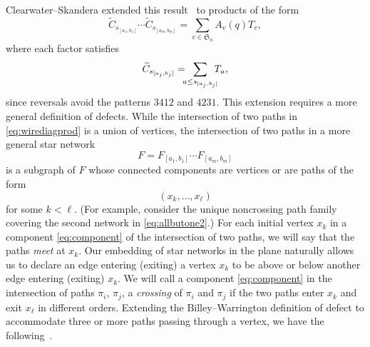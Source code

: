 \documentclass[12pt]{amsart}
\theoremstyle{definition}
\numberwithin{equation}{section}
\newcommand{\sn}{\mathfrak{S}_n}
\newcommand{\hnq}{H_n(q)}
\newcommand{\hanq}{H_n^{\msfA}(q)}
\newcommand{\wtc}[2]{\widetilde{C}_{#1}}
\newcommand{\avoidp}{avoid the patterns $3412$ and $4231${}}
\newcommand{\nTksp}{\negthickspace\negthickspace}
\newcommand{\msfA}{\mathsf{A}}
\newcommand{\msfBC}{\mathsf{BC}}
\begin{document}
Clearwater--Skandera 
extended this 
result~\cite[Cor.\,5.3]{CSkanTNNChar} to products of the form
\begin{equation}\label{eq:CSprod}
\wtc{s_{[a_1,b_1]}}q \cdots \wtc{s_{[a_m,b_m]}}q
= \sum_{v \in \sn} A_v(q) T_v,
\end{equation}
where 
each factor satisfies
\begin{equation*}
    \wtc{s_{[a_j,b_j]}}q = \nTksp \sum_{u \leq s_{[a_j,b_j]}} \nTksp T_u,
\end{equation*}
since reversals \avoidp.
This extension requires a more general definition of defects.
While the intersection of two paths in 
\eqref{eq:wirediagprod} is a union of vertices,
the intersection of two paths in a more general star network
\begin{equation*}
F = F_{[a_1,b_1]} \cdots F_{[a_m,b_m]}
\end{equation*}
is a subgraph of $F$ whose connected components are vertices or are paths of the form 
\begin{equation}\label{eq:component}
(x_k,\dotsc, x_\ell)
\end{equation}
for some $k < \ell$.  (For example, consider the unique noncrossing path family covering the second network in \eqref{eq:allbutone2}.) %
For each initial vertex $x_k$ in a component \eqref{eq:component} of the intersection of two paths, we will say that the paths {\em meet} at $x_k$.
Our embedding of star networks
in the plane naturally allows us to declare an edge entering (exiting) a vertex $x_k$ to be above or below another edge entering (exiting) $x_k$.
We will call a component \eqref{eq:component} in the intersection of paths $\pi_i$, $\pi_j$,
a {\em crossing} of $\pi_i$ and $\pi_j$ if the two paths enter $x_k$ and exit $x_\ell$ in different orders.
Extending the Billey--Warrington definition of defect to accommodate three or more paths passing through a vertex, we have the following~\cite[\S 5]{CSkanTNNChar}.
\end{document}
